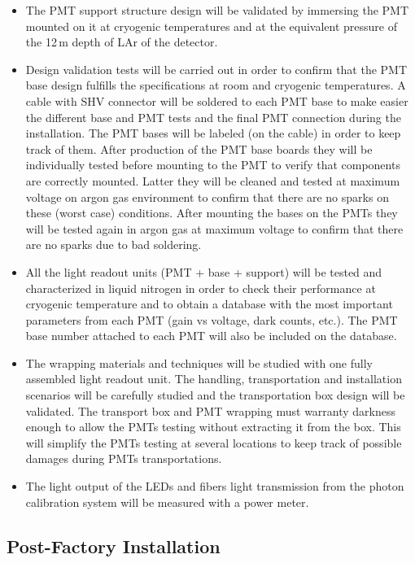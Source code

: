 \begin{itemize}
\item The PMT support structure design will be validated by immersing the PMT mounted on it at cryogenic temperatures and at the equivalent pressure of the 12\,m depth of LAr of the detector.
\item Design validation tests will be carried out in order to confirm that the PMT base design fulfills the specifications at room and cryogenic temperatures. A cable with SHV connector will be soldered to each PMT base to make easier the different base and PMT tests and the final PMT connection during the installation. The PMT bases will be labeled (on the cable) in order to keep track of them. After production of the PMT base boards they will be individually tested before mounting to the PMT to verify that components are correctly mounted. Latter they will be cleaned and tested at maximum voltage on argon gas environment to confirm that there are no sparks on these (worst case) conditions.
After mounting the bases on the PMTs they will be tested again in argon gas at maximum voltage to confirm that there are no sparks due to bad soldering.
\item All the light readout units (PMT + base + support) will be tested and characterized in liquid nitrogen in order to check their performance at cryogenic temperature and to obtain a database with the most important parameters from each PMT (gain vs voltage, dark counts, etc.). The PMT base number attached to each PMT will also be included on the database. 
\item The wrapping materials and techniques will be studied with one fully assembled light readout unit. The handling, transportation and installation scenarios will be carefully studied and the transportation box design will be validated. The transport box and PMT wrapping must warranty darkness enough to allow the PMTs testing without extracting it from the box. This will simplify the PMTs testing at several locations to keep track of possible damages during PMTs transportations.
\item The light output of the LEDs and fibers light transmission from the photon calibration system will be measured with a power meter.
\end{itemize}

 \subsection{Post-Factory Installation}
 \label{sec:fddp-pd-10.2}
 
